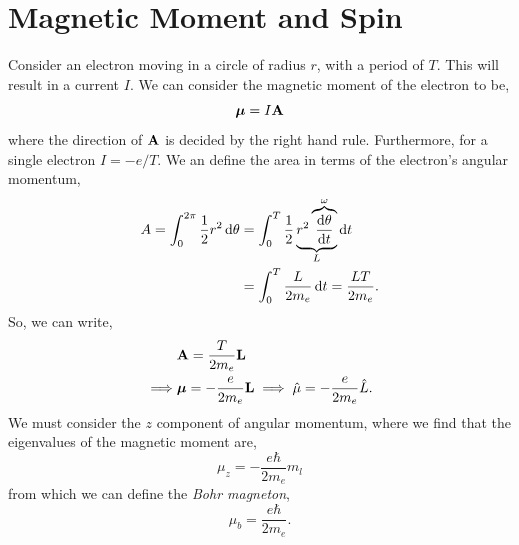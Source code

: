 \documentclass{book}
\begin{document}
\section{Magnetic Moment and Spin}
Consider an electron moving in a circle of radius $r$, with a period of $T$. This will result in a current $I$. We can consider the magnetic moment of the electron to be,
\begin{equation}
	\vb*{\mu} = I \vb{A}
\end{equation}
where the direction of $\vb{A}$ is decided by the right hand rule. Furthermore, for a single electron $I = -e/T$. We an define the area in terms of the electron's angular momentum,
\begin{equation}
	\begin{split}
		A = \int_0^{2\pi}\frac{1}{2}r^2\dd{\theta} & = \int_0^{T}\frac{1}{2}\underbrace{r^2\overbrace{\dv{\theta}{t}}^{\omega}}_{L}\dd{t} \\
		& = \int_0^T\frac{L}{2m_e}\dd{t} = \frac{LT}{2m_e}.
	\end{split}
\end{equation}
So, we can write,
\begin{align}
	& \vb{A} = \frac{T}{2m_e}\vb{L} \\
	\implies & \vb*{\mu} = - \frac{e}{2m_e}\vb{L} \implies \hat{\mu} = -\frac{e}{2m_e}\hat{L}.
\end{align}
We must consider the $z$ component of angular momentum, where we find that the eigenvalues of the magnetic moment are,
\begin{equation}
	\mu_z = -\frac{e\hbar}{2m_e}m_l \label{eq:muz}
\end{equation}
from which we can define the \textit{Bohr magneton},
\begin{equation}
	\mu_b = \frac{e\hbar}{2m_e}.
\end{equation}
\end{document}
